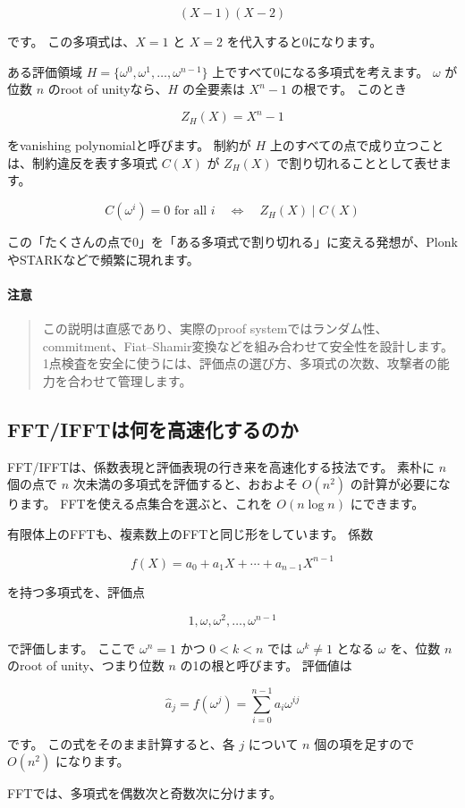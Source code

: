 \documentclass[a4paper,11pt]{ltjsarticle}
\newenvironment{warnbox}{%
  \paragraph*{注意}\begin{quote}
}{%
  \end{quote}
}
\begin{document}
\[
  (X-1)(X-2)
\]

です。
この多項式は、\(X=1\) と \(X=2\) を代入すると0になります。

ある評価領域 \(H=\{\omega^0,\omega^1,\ldots,\omega^{n-1}\}\) 上ですべて0になる多項式を考えます。
\(\omega\) が位数 \(n\) のroot of unityなら、\(H\) の全要素は \(X^n-1\) の根です。
このとき

\[
  Z_H(X)=X^n-1
\]

をvanishing polynomialと呼びます。
制約が \(H\) 上のすべての点で成り立つことは、制約違反を表す多項式 \(C(X)\) が \(Z_H(X)\) で割り切れることとして表せます。

\[
  C(\omega^i)=0 \text{ for all } i
  \quad \Longleftrightarrow \quad
  Z_H(X) \mid C(X)
\]

この「たくさんの点で0」を「ある多項式で割り切れる」に変える発想が、PlonkやSTARKなどで頻繁に現れます。

\begin{warnbox}
この説明は直感であり、実際のproof systemではランダム性、commitment、Fiat--Shamir変換などを組み合わせて安全性を設計します。
1点検査を安全に使うには、評価点の選び方、多項式の次数、攻撃者の能力を合わせて管理します。
\end{warnbox}

\subsection{FFT/IFFTは何を高速化するのか}

FFT/IFFTは、係数表現と評価表現の行き来を高速化する技法です。
素朴に \(n\) 個の点で \(n\) 次未満の多項式を評価すると、おおよそ \(O(n^2)\) の計算が必要になります。
FFTを使える点集合を選ぶと、これを \(O(n \log n)\) にできます。

有限体上のFFTも、複素数上のFFTと同じ形をしています。
係数

\[
  f(X)=a_0+a_1X+\cdots+a_{n-1}X^{n-1}
\]

を持つ多項式を、評価点

\[
  1,\omega,\omega^2,\ldots,\omega^{n-1}
\]

で評価します。
ここで \(\omega^n=1\) かつ \(0<k<n\) では \(\omega^k\ne1\) となる \(\omega\) を、位数 \(n\) のroot of unity、つまり位数 \(n\) の1の根と呼びます。
評価値は

\[
  \hat{a}_j=f(\omega^j)=\sum_{i=0}^{n-1}a_i\omega^{ij}
\]

です。
この式をそのまま計算すると、各 \(j\) について \(n\) 個の項を足すので \(O(n^2)\) になります。

FFTでは、多項式を偶数次と奇数次に分けます。
\end{document}
